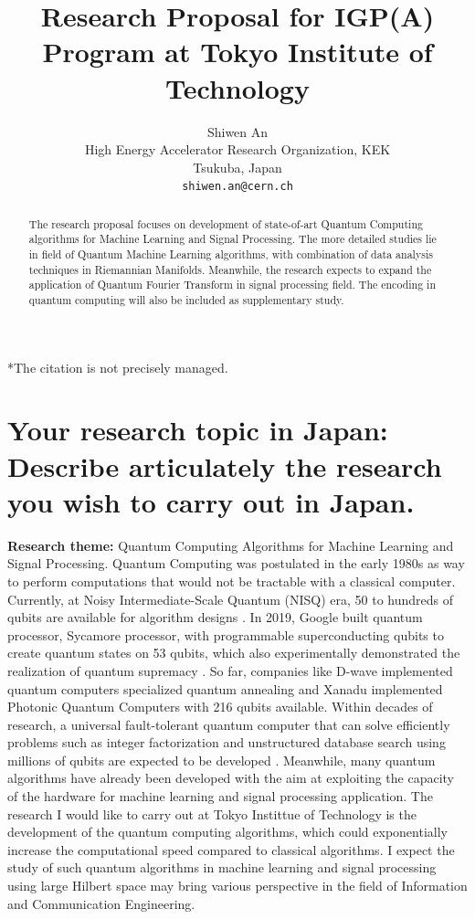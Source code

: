 \documentclass{article}
\title{Research Proposal for IGP(A) Program at Tokyo 
Institute of Technology}
\author{
 Shiwen An \\
 High Energy Accelerator Research Organization, KEK \\
  Tsukuba, Japan \\
  \texttt{shiwen.an@cern.ch} \\
}
\begin{document}
\maketitle
\begin{abstract}
The research proposal focuses on development of 
state-of-art Quantum Computing algorithms for Machine Learning 
and Signal Processing. The more detailed 
studies lie in field of Quantum Machine Learning algorithms, with combination 
of data analysis techniques in Riemannian Manifolds. Meanwhile, the research 
expects to expand the application of Quantum Fourier Transform in signal 
processing field. The encoding in quantum computing will also be 
included as supplementary study. 
\end{abstract}


*The citation is not precisely managed. 

\section{Your research topic in Japan:
Describe articulately the research you wish
to carry out in Japan.}
\textbf{Research theme:} Quantum Computing Algorithms for 
Machine Learning and Signal Processing.  \newline 
\newline
Quantum Computing was postulated in the early 1980s as way to 
perform computations that would not be tractable with a classical 
computer. Currently, at Noisy Intermediate-Scale Quantum (NISQ)
era, 50 to hundreds of qubits are available for algorithm designs \cite{aps_review}.
In 2019, Google built quantum processor, Sycamore processor, 
with programmable superconducting qubits to create quantum states on 
53 qubits, which also experimentally demonstrated the realization of 
quantum supremacy \cite{qc_supremacy}.
So far, companies like D-wave implemented quantum computers specialized 
quantum annealing and Xanadu implemented Photonic Quantum Computers with 
216 qubits available. 
 Within decades of research, a universal fault-tolerant 
quantum computer that can solve efficiently problems such 
as integer factorization and unstructured database search using 
millions of qubits are expected to be developed \cite{qml_hep}. 
Meanwhile, many quantum algorithms have already been  
developed with the aim at exploiting the capacity of the 
hardware for machine learning and signal processing application. 
The research I would like to carry out at Tokyo Instittue of Technology
is the development of the quantum computing algorithms, which could 
exponentially increase the computational speed compared to classical 
algorithms. I expect the study of such 
quantum algorithms in machine learning and signal processing 
using large Hilbert space may bring various perspective 
in the field of Information and Communication Engineering. 
\end{document}
